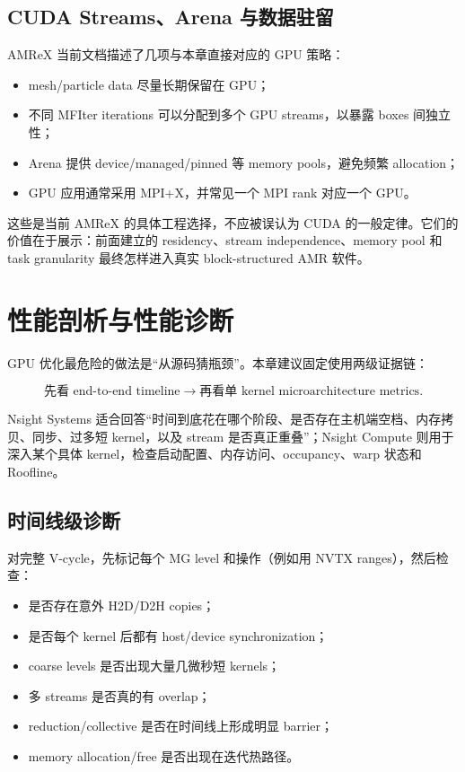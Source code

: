 \subsection{CUDA Streams、Arena 与数据驻留}

AMReX 当前文档描述了几项与本章直接对应的 GPU 策略\cite{amrexGPUdocs2026}：
\begin{itemize}
\item mesh/particle data 尽量长期保留在 GPU；
\item 不同 MFIter iterations 可以分配到多个 GPU streams，以暴露 boxes 间独立性；
\item Arena 提供 device/managed/pinned 等 memory pools，避免频繁 allocation；
\item GPU 应用通常采用 MPI+X，并常见一个 MPI rank 对应一个 GPU。
\end{itemize}

这些是当前 AMReX 的具体工程选择，不应被误认为 CUDA 的一般定律。它们的价值在于展示：前面建立的 residency、stream independence、memory pool 和 task granularity 最终怎样进入真实 block-structured AMR 软件。

\section{性能剖析与性能诊断}
\label{sec:gpu-profiling}

GPU 优化最危险的做法是“从源码猜瓶颈”。本章建议固定使用两级证据链：

\begin{equation}
\boxed{
\text{先看 end-to-end timeline}
\rightarrow
\text{再看单 kernel microarchitecture metrics}.
}
\label{eq:gpu-profiling-chain}
\end{equation}

Nsight Systems 适合回答“时间到底花在哪个阶段、是否存在主机端空档、内存拷贝、同步、过多短 kernel，以及 stream 是否真正重叠”；Nsight Compute 则用于深入某个具体 kernel，检查启动配置、内存访问、occupancy、warp 状态和 Roofline\cite{nsightSystems2026,nsightCompute2026}。

\subsection{时间线级诊断}

对完整 V-cycle，先标记每个 MG level 和操作（例如用 NVTX ranges），然后检查：
\begin{itemize}
\item 是否存在意外 H2D/D2H copies；
\item 是否每个 kernel 后都有 host/device synchronization；
\item coarse levels 是否出现大量几微秒短 kernels；
\item 多 streams 是否真的有 overlap；
\item reduction/collective 是否在时间线上形成明显 barrier；
\item memory allocation/free 是否出现在迭代热路径。
\end{itemize}

